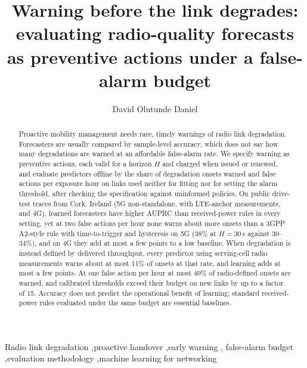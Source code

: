 \documentclass[preprint,review,12pt]{elsarticle}
\begin{document}
\begin{frontmatter}

\title{Warning before the link degrades: evaluating radio-quality forecasts as preventive actions under a false-alarm budget}

\author{David Olutunde Daniel}
\address{Department of Mathematical Sciences, The University of Texas at Dallas, 800 W.\ Campbell Rd, Richardson, TX 75080, United States; and AT\&T Chief Data Office, Dallas, TX, United States}

\begin{abstract}
Proactive mobility management needs rare, timely warnings of radio link degradation.
Forecasters are usually compared by sample-level accuracy, which does not say how many
degradations are warned at an affordable false-alarm rate. We specify warning as
preventive actions, each valid for a horizon $H$ and charged when issued or renewed,
and evaluate predictors offline by the share of degradation onsets warned and false
actions per exposure hour on links used neither for fitting nor for setting the alarm
threshold, after checking the specification against uninformed policies. On public
drive-test traces from Cork, Ireland (5G non-standalone, with LTE-anchor measurements,
and 4G), learned forecasters have higher AUPRC than received-power rules in every
setting, yet at two false actions per hour none warns about more onsets than a 3GPP
A2-style rule with time-to-trigger and hysteresis on 5G (38\% at $H=30$\,s against
30--34\%), and on 4G they add at most a few points to a low baseline. When degradation
is instead defined by delivered throughput, every predictor using serving-cell radio
measurements warns about at most 11\% of onsets at that rate, and learning adds at
most a few points. At one false action per hour at most 40\% of radio-defined onsets
are warned, and calibrated thresholds exceed their budget on new links by up to a
factor of 15. Accuracy does not predict the operational benefit of learning; standard
received-power rules evaluated under the same budget are essential baselines.
\end{abstract}

\begin{keyword}
Radio link degradation \sep proactive handover \sep early warning \sep
false-alarm budget \sep evaluation methodology \sep machine learning for networking
\end{keyword}
\end{frontmatter}

\end{document}
